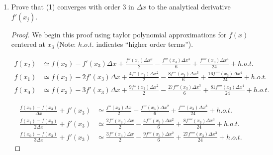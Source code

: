 \documentclass{article}
\begin{document}
\begin{enumerate}
\begin{proof}
        \begin{align}
            f'(x_3) &\simeq f(x_0) l_0'(x_3) + f(x_1) l_1'(x_3) + f(x_2) l_2'(x_3) + f(x_3)l_3'(x_3) \\
                          &\simeq -\frac{f(x_0)}{3\Delta x} + \frac{3f(x_1)}{2\Delta x} - \frac{3f(x_2)}{\Delta x} + \frac{11f(x_3)}{6\Delta x} \\
                          &\simeq \frac{11f(x_3) - 18f(x_2)+ 9f(x_1)-2f(x_0)}{6\Delta x}
\
        \end{align}
    \end{proof}

    \item Prove that (1) converges with order 3 in $\Delta x$ to the analytical derivative $f'(x_j)$.

    \begin{proof}
    
        We begin this proof using taylor polynomial approximations for $f(x)$ centered at $x_3$ (Note: $h.o.t.$ indicates ``higher order terms'').
        
        \begin{align}
            f(x_2) &\simeq f(x_3) - f'(x_3)\Delta x + \frac{f''(x_3)\Delta x^2}{2} - \frac{f'''(x_3) \Delta x^3}{6} + \frac{f''''(x_3)\Delta x^4}{24} + h.o.t. \\
            f(x_1) &\simeq f(x_3) - 2f'(x_3)\Delta x + \frac{4f''(x_3)\Delta x^2}{2} - \frac{8f'''(x_3) \Delta x^3}{6} + \frac{16f''''(x_3)\Delta x^4}{24} + h.o.t. \\
            f(x_0) &\simeq f(x_3) - 3f'(x_3)\Delta x + \frac{9f''(x_3)\Delta x^2}{2} - \frac{27f'''(x_3) \Delta x^3}{6} + \frac{81f''''(x_3)\Delta x^4}{24} + h.o.t. 
        \end{align}

        \begin{align}
            \frac{f(x_2) - f(x_3)}{\Delta x} + f'(x_3) &\simeq \frac{f''(x_3)\Delta x}{2} - \frac{f'''(x_3) \Delta x^2}{6} + \frac{f''''(x_3)\Delta x^3}{24} + h.o.t. \\
            \frac{f(x_1) - f(x_3)}{2\Delta x} + f'(x_3) &\simeq \frac{2f''(x_3)\Delta x}{2} - \frac{4f'''(x_3) \Delta x^2}{6} + \frac{8f''''(x_3)\Delta x^3}{24} + h.o.t. \\
            \frac{f(x_0) - f(x_3)}{3\Delta x} + f'(x_3) &\simeq \frac{3f''(x_3)\Delta x}{2} - \frac{9f'''(x_3) \Delta x^2}{6} + \frac{27f''''(x_3)\Delta x^3}{24} + h.o.t. 
        \end{align}


\end{proof}
\end{enumerate}
\end{document}
